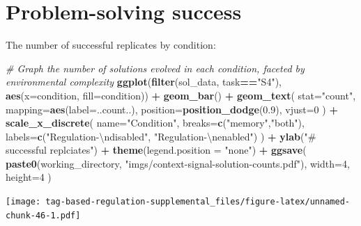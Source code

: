 \documentclass[
]{book}
\newenvironment{Shaded}{\begin{snugshade}}{\end{snugshade}}
\newcommand{\CharTok}[1]{\textcolor[rgb]{0.31,0.60,0.02}{#1}}
\newcommand{\CommentTok}[1]{\textcolor[rgb]{0.56,0.35,0.01}{\textit{#1}}}
\newcommand{\DataTypeTok}[1]{\textcolor[rgb]{0.13,0.29,0.53}{#1}}
\newcommand{\DecValTok}[1]{\textcolor[rgb]{0.00,0.00,0.81}{#1}}
\newcommand{\FloatTok}[1]{\textcolor[rgb]{0.00,0.00,0.81}{#1}}
\newcommand{\KeywordTok}[1]{\textcolor[rgb]{0.13,0.29,0.53}{\textbf{#1}}}
\newcommand{\NormalTok}[1]{#1}
\newcommand{\OperatorTok}[1]{\textcolor[rgb]{0.81,0.36,0.00}{\textbf{#1}}}
\newcommand{\StringTok}[1]{\textcolor[rgb]{0.31,0.60,0.02}{#1}}
\begin{document}
\hypertarget{problem-solving-success-1}{%
\section{Problem-solving success}\label{problem-solving-success-1}}

The number of successful replicates by condition:

\begin{Shaded}
\begin{Highlighting}[]
\CommentTok{\# Graph the number of solutions evolved in each condition, faceted by environmental complexity}
\KeywordTok{ggplot}\NormalTok{(}\KeywordTok{filter}\NormalTok{(sol\_data, task}\OperatorTok{==}\StringTok{"S4"}\NormalTok{), }\KeywordTok{aes}\NormalTok{(}\DataTypeTok{x=}\NormalTok{condition, }\DataTypeTok{fill=}\NormalTok{condition)) }\OperatorTok{+}
\StringTok{  }\KeywordTok{geom\_bar}\NormalTok{() }\OperatorTok{+}
\StringTok{  }\KeywordTok{geom\_text}\NormalTok{(}
    \DataTypeTok{stat=}\StringTok{"count"}\NormalTok{,}
    \DataTypeTok{mapping=}\KeywordTok{aes}\NormalTok{(}\DataTypeTok{label=}\NormalTok{..count..),}
    \DataTypeTok{position=}\KeywordTok{position\_dodge}\NormalTok{(}\FloatTok{0.9}\NormalTok{),}
    \DataTypeTok{vjust=}\DecValTok{0}
\NormalTok{  ) }\OperatorTok{+}
\StringTok{  }\KeywordTok{scale\_x\_discrete}\NormalTok{(}
    \DataTypeTok{name=}\StringTok{"Condition"}\NormalTok{,}
    \DataTypeTok{breaks=}\KeywordTok{c}\NormalTok{(}\StringTok{"memory"}\NormalTok{,}\StringTok{"both"}\NormalTok{),}
    \DataTypeTok{labels=}\KeywordTok{c}\NormalTok{(}\StringTok{"Regulation{-}}\CharTok{\textbackslash{}n}\StringTok{disabled"}\NormalTok{, }\StringTok{"Regulation{-}}\CharTok{\textbackslash{}n}\StringTok{enabled"}\NormalTok{)}
\NormalTok{  ) }\OperatorTok{+}
\StringTok{  }\KeywordTok{ylab}\NormalTok{(}\StringTok{"\# successful replciates"}\NormalTok{) }\OperatorTok{+}
\StringTok{  }\KeywordTok{theme}\NormalTok{(}\DataTypeTok{legend.position =} \StringTok{"none"}\NormalTok{) }\OperatorTok{+}
\StringTok{  }\KeywordTok{ggsave}\NormalTok{(}
    \KeywordTok{paste0}\NormalTok{(working\_directory, }\StringTok{"imgs/context{-}signal{-}solution{-}counts.pdf"}\NormalTok{),}
    \DataTypeTok{width=}\DecValTok{4}\NormalTok{,}
    \DataTypeTok{height=}\DecValTok{4}
\NormalTok{  )}
\end{Highlighting}
\end{Shaded}

\texttt{[image: tag-based-regulation-supplemental\_files/figure-latex/unnamed-chunk-46-1.pdf]}
\end{document}

